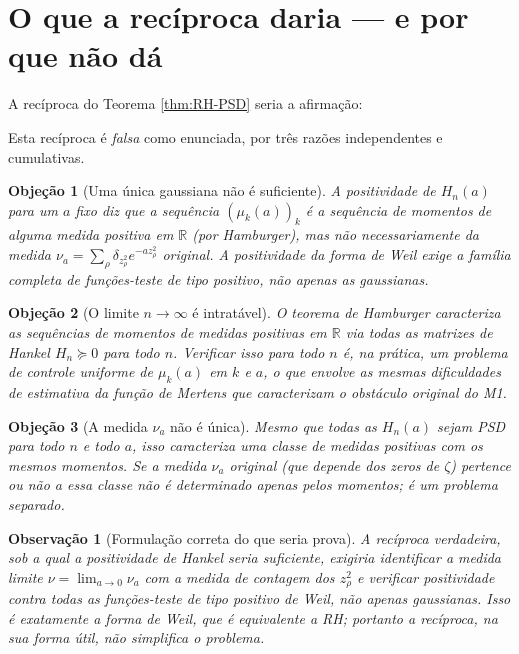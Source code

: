 \documentclass[12pt,a4paper]{article}
\newtheorem{observacao}{Observação}
\newtheorem{objecao}{Objeção}
\begin{document}
\section{O que a recíproca daria — e por que não dá}

A recíproca do Teorema \ref{thm:RH-PSD} seria a afirmação:
\begin{center}
\end{center}

Esta recíproca é \emph{falsa} como enunciada, por três razões
independentes e cumulativas.

\begin{objecao}[Uma única gaussiana não é suficiente]
A positividade de $H_n(a)$ para um $a$ fixo diz que a sequência
$(\mu_k(a))_k$ é a sequência de momentos de \emph{alguma} medida
positiva em $\mathbb{R}$ (por Hamburger), mas não necessariamente da
medida $\nu_a = \sum_\rho \delta_{z_\rho^2} e^{-az_\rho^2}$
\emph{original}. A positividade da forma de Weil exige a família
completa de funções-teste de tipo positivo, não apenas as gaussianas.
\end{objecao}

\begin{objecao}[O limite $n\to\infty$ é intratável]
O teorema de Hamburger caracteriza as sequências de momentos de medidas
positivas em $\mathbb{R}$ via \emph{todas} as matrizes de Hankel
$H_n\succeq 0$ para todo $n$. Verificar isso para \emph{todo} $n$ é,
na prática, um problema de controle uniforme de $\mu_k(a)$ em $k$ e
$a$, o que envolve as mesmas dificuldades de estimativa da função de
Mertens que caracterizam o obstáculo original do M1.
\end{objecao}

\begin{objecao}[A medida $\nu_a$ não é única]
Mesmo que todas as $H_n(a)$ sejam PSD para todo $n$ e todo $a$, isso
caracteriza uma \emph{classe} de medidas positivas com os mesmos
momentos. Se a medida $\nu_a$ original (que depende dos zeros de
$\zeta$) pertence ou não a essa classe não é determinado apenas pelos
momentos; é um problema separado.
\end{objecao}

\begin{observacao}[Formulação correta do que seria prova]
A recíproca verdadeira, sob a qual a positividade de Hankel \emph{seria}
suficiente, exigiria identificar a medida limite
$\nu = \lim_{a\to 0}\nu_a$ com a medida de contagem dos $z_\rho^2$ e
verificar positividade contra \emph{todas} as funções-teste de tipo
positivo de Weil, não apenas gaussianas. Isso é exatamente a forma de
Weil, que é equivalente a RH; portanto a recíproca, na sua forma útil,
\emph{não simplifica} o problema.
\end{observacao}
\end{document}
